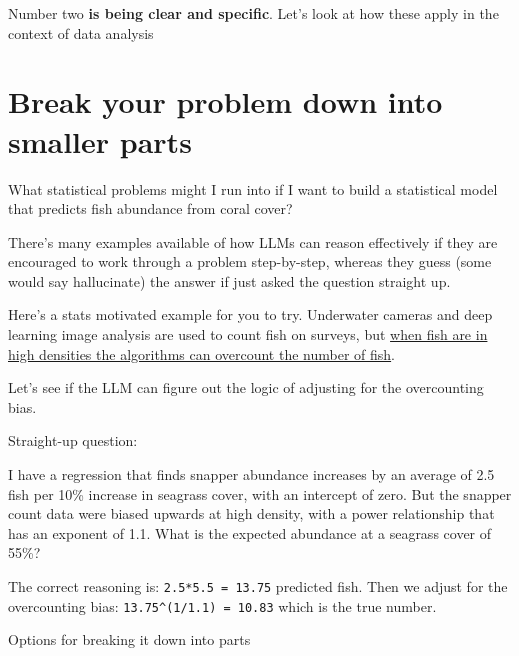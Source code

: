 \documentclass[
  letterpaper,
  DIV=11,
  numbers=noendperiod]{scrreprt}
\begin{document}
Number two \textbf{is being clear and specific}. Let's look at how these
apply in the context of data analysis

\section{Break your problem down into smaller
parts}\label{break-your-problem-down-into-smaller-parts}

What statistical problems might I run into if I want to build a
statistical model that predicts fish abundance from coral cover?

There's many examples available of how LLMs can reason effectively if
they are encouraged to work through a problem step-by-step, whereas they
guess (some would say hallucinate) the answer if just asked the question
straight up.

Here's a stats motivated example for you to try. Underwater cameras and
deep learning image analysis are used to count fish on surveys, but
\href{TODO\%20add\%20ref}{when fish are in high densities the algorithms
can overcount the number of fish}.

Let's see if the LLM can figure out the logic of adjusting for the
overcounting bias.

Straight-up question:

\begin{tcolorbox}[enhanced jigsaw, coltitle=black, breakable, toptitle=1mm, titlerule=0mm, bottomtitle=1mm, colframe=quarto-callout-note-color-frame, left=2mm, leftrule=.75mm, title=\textcolor{quarto-callout-note-color}{\faInfo}\hspace{0.5em}{Note}, opacityback=0, colback=white, opacitybacktitle=0.6, bottomrule=.15mm, arc=.35mm, rightrule=.15mm, toprule=.15mm, colbacktitle=quarto-callout-note-color!10!white]

I have a regression that finds snapper abundance increases by an average
of 2.5 fish per 10\% increase in seagrass cover, with an intercept of
zero. But the snapper count data were biased upwards at high density,
with a power relationship that has an exponent of 1.1. What is the
expected abundance at a seagrass cover of 55\%?

\end{tcolorbox}

The correct reasoning is: \texttt{2.5*5.5\ =\ 13.75} predicted fish.
Then we adjust for the overcounting bias:
\texttt{13.75\^{}(1/1.1)\ =\ 10.83} which is the true number.

Options for breaking it down into parts
\end{document}
